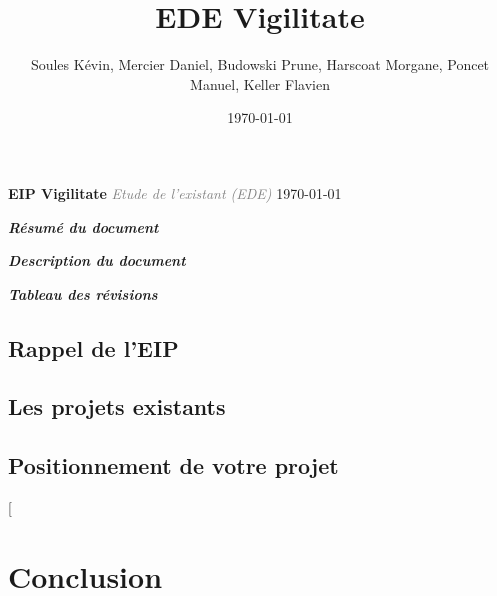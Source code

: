 \documentclass[a4paper,12pt]{report}
\title{EDE Vigilitate}
\author{Soules Kévin, Mercier Daniel, Budowski Prune, Harscoat Morgane, Poncet Manuel, Keller Flavien}
\date{\today}
\begin{document}

\begin{center}\textcolor{myBlue}{\Huge \textbf{EIP Vigilitate}}\linebreak
\thispagestyle{empty}
\textcolor{gray}{\textit{\Large Etude de l'existant (EDE)}}\linebreak
{}
{\today}\end{center}
\newpage
{}
\begin{flushleft}\textcolor{myBlue}{\textit{\large \textbf{Résumé du document}}} \linebreak \end{flushleft}


\newpage
\begin{flushleft}
\textcolor{myBlue}{\textit{\large \textbf{Description du document}}} 
\bigbreak

\bigbreak
\bigbreak
\textcolor{myBlue}{\textit{\large \textbf{Tableau des révisions}}}
\bigbreak


\end{flushleft}
\tableofcontents
\thispagestyle{fancy}

\textcolor{myBlue}{\chapter{Rappel de l'EIP}}



\textcolor{myBlue}{\chapter{Les projets existants}}

 \newpage
 \newpage
 \newpage
 \newpage


\textcolor{myBlue}{\chapter{Positionnement de votre projet}}

\textcolor{myBlue}{[\chapter{Conclusion}}


\end{document}
